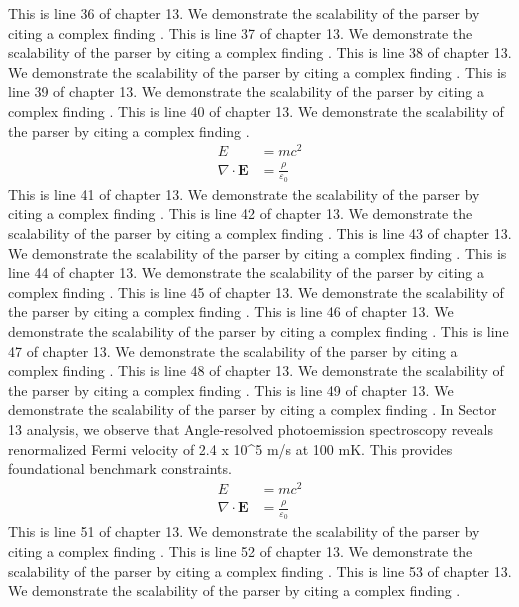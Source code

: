 This is line 36 of chapter 13. We demonstrate the scalability of the parser by citing a complex finding \cite{ref13_36}.
This is line 37 of chapter 13. We demonstrate the scalability of the parser by citing a complex finding \cite{ref13_37}.
This is line 38 of chapter 13. We demonstrate the scalability of the parser by citing a complex finding \cite{ref13_38}.
This is line 39 of chapter 13. We demonstrate the scalability of the parser by citing a complex finding \cite{ref13_39}.
This is line 40 of chapter 13. We demonstrate the scalability of the parser by citing a complex finding \cite{ref13_40}.
\begin{align*}
  E &= mc^2 \\
  \nabla \cdot \mathbf{E} &= \frac{\rho}{\varepsilon_0}
\end{align*}
This is line 41 of chapter 13. We demonstrate the scalability of the parser by citing a complex finding \cite{ref13_41}.
This is line 42 of chapter 13. We demonstrate the scalability of the parser by citing a complex finding \cite{ref13_42}.
This is line 43 of chapter 13. We demonstrate the scalability of the parser by citing a complex finding \cite{ref13_43}.
This is line 44 of chapter 13. We demonstrate the scalability of the parser by citing a complex finding \cite{ref13_44}.
This is line 45 of chapter 13. We demonstrate the scalability of the parser by citing a complex finding \cite{ref13_45}.
This is line 46 of chapter 13. We demonstrate the scalability of the parser by citing a complex finding \cite{ref13_46}.
This is line 47 of chapter 13. We demonstrate the scalability of the parser by citing a complex finding \cite{ref13_47}.
This is line 48 of chapter 13. We demonstrate the scalability of the parser by citing a complex finding \cite{ref13_48}.
This is line 49 of chapter 13. We demonstrate the scalability of the parser by citing a complex finding \cite{ref13_49}.
In Sector 13 analysis, we observe that Angle-resolved photoemission spectroscopy reveals renormalized Fermi velocity of 2.4 x 10^5 m/s at 100 mK. This provides foundational benchmark constraints.
\begin{align*}
  E &= mc^2 \\
  \nabla \cdot \mathbf{E} &= \frac{\rho}{\varepsilon_0}
\end{align*}
This is line 51 of chapter 13. We demonstrate the scalability of the parser by citing a complex finding \cite{ref13_51}.
This is line 52 of chapter 13. We demonstrate the scalability of the parser by citing a complex finding \cite{ref13_52}.
This is line 53 of chapter 13. We demonstrate the scalability of the parser by citing a complex finding \cite{ref13_53}.
